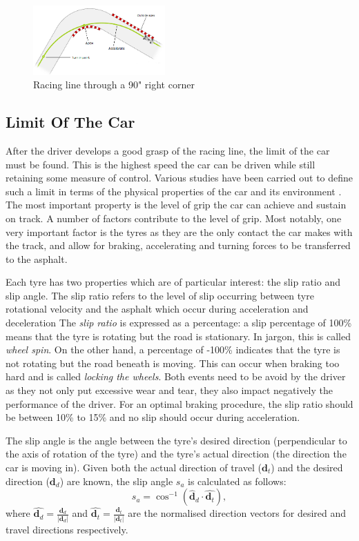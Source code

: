 \documentclass{sig-alternate}
\begin{document}
{\begin{figure}[!htb]
	\centering
	\includegraphics[width=0.45\textwidth]{images/cornerraceline}
	\caption{Racing line through a 90" right corner}
	\label{fig:CornerRaceLine}
\end{figure}

\subsection{Limit Of The Car}
After the driver develops a good grasp of the racing line, the limit of the car must be found. This is the highest speed the car can be driven while still retaining some measure of control. Various studies have been carried out to define such a limit in terms of the physical properties of the car and its environment \cite{beckman1991physics}. The most important property is the level of grip the car can achieve and sustain on track. A number of factors contribute to the level of grip. Most notably, one very important factor is the tyres as they are the only contact the car makes with the track, and allow for braking, accelerating and turning forces to be transferred to the asphalt.

Each tyre has two properties which are of particular interest: the slip ratio and slip angle. The slip ratio refers to the level of slip occurring between tyre rotational velocity and the asphalt which occur during acceleration and deceleration The \emph{slip ratio} is expressed as a percentage: a slip percentage of 100\% means that the tyre is rotating but the road is stationary. In jargon, this is called \emph{wheel spin}. On the other hand, a percentage of -100\% indicates that the tyre is not rotating but the road beneath is moving. This can occur when braking too hard and is called \emph{locking the wheels}. Both events need to be avoid by the driver as they not only put excessive wear and tear, they also impact negatively the performance of the driver. For an optimal braking procedure, the slip ratio should be between 10\% to 15\% \cite{GoingFaster} and no slip should occur during acceleration.

The slip angle is the angle between the tyre's desired direction (perpendicular to the axis of rotation of the tyre) and the tyre's actual direction (the direction the car is moving in). Given both the actual direction of travel ($\mathbf{d}_t$) and the desired direction ($\mathbf{d}_d$) are known, the slip angle $s_a$ is calculated as follows:
\begin{equation}
s_a = \cos^{-1}(\hat{\mathbf{d}}_d \cdot \hat{\mathbf{d}_t}),
\end{equation}
\noindent where $\hat{\mathbf{d}_d} = \frac{\mathbf{d}_d}{|\mathbf{d}_d|}$ and $\hat{\mathbf{d}_t} = \frac{\mathbf{d}_t}{|\mathbf{d}_t|}$ are the normalised direction vectors for desired and travel directions respectively.

}
\end{document}
